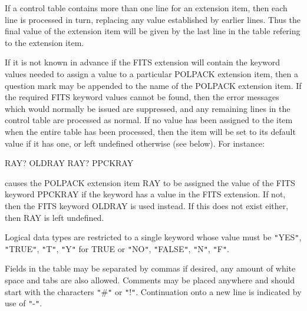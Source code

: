 {{      If a control table contains more than one line for an extension
      item, then each line is processed in turn, replacing any value
      established by earlier lines. Thus the final value of the extension
      item will be given by the last line in the table refering to the
      extension item.

      If it is not known in advance if the FITS extension will contain the
      keyword values needed to assign a value to a particular POLPACK
      extension item, then a question mark may be appended to the name of
      the POLPACK extension item. If the required FITS keyword values
      cannot be found, then the error messages which would normally be
      issued are suppressed, and any remaining lines in the control table
      are processed as normal. If no value has been assigned to the item
      when the entire table has been processed, then the item will be set
      to its default value if it has one, or left undefined otherwise (see
      below). For instance:

         RAY?  OLDRAY
         RAY?  PPCKRAY

      causes the POLPACK extension item RAY to be assigned the value of the
      FITS keyword PPCKRAY if the keyword has a value in the FITS
      extension. If not, then the FITS keyword OLDRAY is used instead. If
      this does not exist either, then RAY is left undefined.

      Logical data types are restricted to a single keyword whose value
      must be {\tt "}YES{\tt "}, {\tt "}TRUE{\tt "}, {\tt "}T{\tt "}, {\tt "}Y{\tt "} for TRUE or {\tt "}NO{\tt "}, {\tt "}FALSE{\tt "}, {\tt "}N{\tt "},
      {\tt "}F{\tt "}.

      Fields in the table may be separated by commas if desired, any
      amount of white space and tabs are also allowed. Comments may be
      placed anywhere and should start with the characters {\tt "}\#{\tt "} or {\tt "}!{\tt "}.
      Continuation onto a new line is indicated by use of {\tt "}-{\tt "}.
   }
   }
